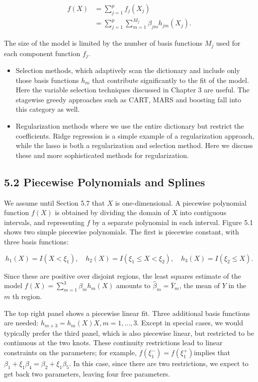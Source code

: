 \documentclass[10pt]{article}
\begin{document}
\begin{align*}
f(X) & =\sum_{j=1}^{p} f_{j}\left(X_{j}\right) \\
& =\sum_{j=1}^{p} \sum_{m=1}^{M_{j}} \beta_{j m} h_{j m}\left(X_{j}\right) . \tag{5.2}
\end{align*}


The size of the model is limited by the number of basis functions $M_{j}$ used for each component function $f_{j}$.

\begin{itemize}
  \item Selection methods, which adaptively scan the dictionary and include only those basis functions $h_{m}$ that contribute significantly to the fit of the model. Here the variable selection techniques discussed in Chapter 3 are useful. The stagewise greedy approaches such as CART, MARS and boosting fall into this category as well.
  \item Regularization methods where we use the entire dictionary but restrict the coefficients. Ridge regression is a simple example of a regularization approach, while the lasso is both a regularization and selection method. Here we discuss these and more sophisticated methods for regularization.
\end{itemize}

\subsection*{5.2 Piecewise Polynomials and Splines}
We assume until Section 5.7 that $X$ is one-dimensional. A piecewise polynomial function $f(X)$ is obtained by dividing the domain of $X$ into contiguous intervals, and representing $f$ by a separate polynomial in each interval. Figure 5.1 shows two simple piecewise polynomials. The first is piecewise constant, with three basis functions:

$$
h_{1}(X)=I\left(X<\xi_{1}\right), \quad h_{2}(X)=I\left(\xi_{1} \leq X<\xi_{2}\right), \quad h_{3}(X)=I\left(\xi_{2} \leq X\right) .
$$

Since these are positive over disjoint regions, the least squares estimate of the model $f(X)=\sum_{m=1}^{3} \beta_{m} h_{m}(X)$ amounts to $\hat{\beta}_{m}=\bar{Y}_{m}$, the mean of $Y$ in the $m$ th region.

The top right panel shows a piecewise linear fit. Three additional basis functions are needed: $h_{m+3}=h_{m}(X) X, m=1, \ldots, 3$. Except in special cases, we would typically prefer the third panel, which is also piecewise linear, but restricted to be continuous at the two knots. These continuity restrictions lead to linear constraints on the parameters; for example, $f\left(\xi_{1}^{-}\right)=f\left(\xi_{1}^{+}\right)$implies that $\beta_{1}+\xi_{1} \beta_{4}=\beta_{2}+\xi_{1} \beta_{5}$. In this case, since there are two restrictions, we expect to get back two parameters, leaving four free parameters.
\end{document}
